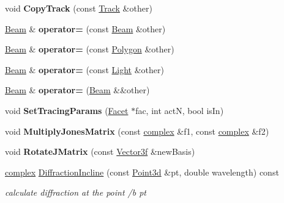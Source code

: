 \begin{DoxyCompactItemize}
\mbox{\label{class_beam_af7f8a41463c9fc4d610f26b747459400}} 
void {\bfseries Copy\+Track} (const \mbox{\hyperlink{class_track}{Track}} \&other)
\item 
\mbox{\label{class_beam_a997934d2767596c43a639d56329b96f7}} 
\mbox{\hyperlink{class_beam}{Beam}} \& {\bfseries operator=} (const \mbox{\hyperlink{class_beam}{Beam}} \&other)
\item 
\mbox{\label{class_beam_a7209c2c0a466af4d5a86949162c102cc}} 
\mbox{\hyperlink{class_beam}{Beam}} \& {\bfseries operator=} (const \mbox{\hyperlink{class_polygon}{Polygon}} \&other)
\item 
\mbox{\label{class_beam_a3e1cf69d3a76b5adcab75c5d8b9073d4}} 
\mbox{\hyperlink{class_beam}{Beam}} \& {\bfseries operator=} (const \mbox{\hyperlink{class_light}{Light}} \&other)
\item 
\mbox{\label{class_beam_af5dbd7b4282b858982753eac9872c741}} 
\mbox{\hyperlink{class_beam}{Beam}} \& {\bfseries operator=} (\mbox{\hyperlink{class_beam}{Beam}} \&\&other)
\item 
\mbox{\label{class_beam_ac330cf4dff292a294912b4ef0a3cd54a}} 
void {\bfseries Set\+Tracing\+Params} (\mbox{\hyperlink{class_facet}{Facet}} $\ast$fac, int actN, bool is\+In)
\item 
\mbox{\label{class_beam_a2213010326ea833a80eb7c611559a1bb}} 
void {\bfseries Multiply\+Jones\+Matrix} (const \mbox{\hyperlink{classcomplex}{complex}} \&f1, const \mbox{\hyperlink{classcomplex}{complex}} \&f2)
\item 
\mbox{\label{class_beam_a65280f7435acc8fb35cc704293254d48}} 
void {\bfseries Rotate\+J\+Matrix} (const \mbox{\hyperlink{struct_point3f}{Vector3f}} \&new\+Basis)
\item 
\mbox{\label{class_beam_ad8f6c8517bddffd413410aa8ee5b8ad2}} 
\mbox{\hyperlink{classcomplex}{complex}} \mbox{\hyperlink{class_beam_ad8f6c8517bddffd413410aa8ee5b8ad2}{Diffraction\+Incline}} (const \mbox{\hyperlink{struct_point3d}{Point3d}} \&pt, double wavelength) const
\begin{DoxyCompactList}\small\item\em calculate diffraction at the point /b pt \end{DoxyCompactList}\end{DoxyCompactItemize}
